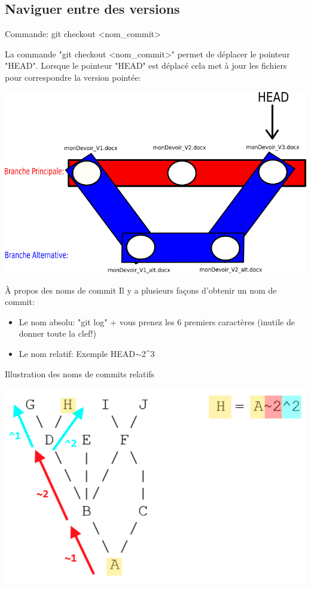 \documentclass{beamer}
\begin{document}
\subsection{Naviguer entre des versions}
\begin{frame}{Commande: git checkout <nom\_commit>}

La commande "git checkout <nom\_commit>" permet de déplacer le pointeur "HEAD". Lorsque le pointeur "HEAD" est déplacé cela met à jour les fichiers pour correspondre la version pointée:
\begin{center}
    \includegraphics[scale=0.45]{images/consulter_versions/secondScenario_branches.png}
\end{center}
\end{frame}

\begin{frame}{À propos des noms de commit}
Il y a plusieurs façons d'obtenir un nom de commit:
\begin{itemize}
    \item Le nom absolu: "git log" + vous prenez les 6 premiers caractères (inutile de donner toute la clef!)
    \item Le nom relatif: Exemple HEAD$\sim$2\string^3
\end{itemize}
\end{frame}

\begin{frame}{Illustration des noms de commits relatifs}
    \begin{center}
        \includegraphics[scale=0.35]{images/nomCommits/nomCommitRelatif.png}
    \end{center}
\end{frame}
\end{document}
